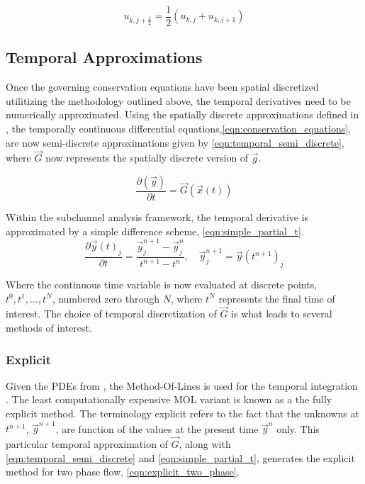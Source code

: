 \begin{equation}
\label{eqn:average_advecting_vel}
u_{k,j+\frac{1}{2}} = \frac{1}{2}\left(u_{k,j} + u_{k, j+1}\right)
\end{equation}

\subsection{Temporal Approximations}
\label{subsect:temporal_approx}
Once the governing conservation equations have been spatial discretized utilitizing the methodology outlined above, the temporal derivatives need to be numerically approximated.
Using the spatially discrete approximations defined in , the temporally continuous differential equations,\eqref{eqn:conservation_equations}, are now semi-discrete approximations given by \eqref{eqn:temporal_semi_discrete}, where $\vec{G}$ now represents the spatially discrete version of $\vec{g}$.

\begin{equation}
\label{eqn:temporal_semi_discrete}
\frac{\partial \left( \vec{y} \right)}{\partial t} = \vec{G}(\vec{x}(t))
\end{equation}

Within the subchannel analysis framework, the temporal derivative is approximated by a simple difference scheme, \eqref{eqn:simple_partial_t}.
\begin{equation}
\label{eqn:simple_partial_t}
\frac{\partial \vec{y}(t)_j}{\partial t} = \frac{ \vec{y}^{n+1}_{j} - \vec{y}^{n}_{j}}{t^{n+1}-t^{n}}, \quad \vec{y}^{n+1}_j = \vec{y}(t^{n+1})_j
\end{equation}

Where the continuous time variable is now evaluated at discrete points, $t^0, t^1, \ldots, t^N$, numbered zero through $N$, where $t^N$ represents the final time of interest.
The choice of temporal discretization of $\vec{G}$ is what leads to several methods of interest.

\subsubsection{Explicit}
\label{subsubsect:numerics_explicit}
Given the PDEs from , the Method-Of-Lines is used for the temporal integration \cite{LeVeque2007}.
The least computationally expensive MOL variant is known as a the fully explicit method.
The terminology explicit refers to the fact that the unknowns at $t^{n+1}$, $\vec{y}^{n+1}$, are function of the values at the present time $\vec{y}^{n}$ only.
This particular temporal approximation of $\vec{G}$, along with \eqref{eqn:temporal_semi_discrete} and \eqref{eqn:simple_partial_t}, generates the explicit method for two phase flow, \eqref{eqn:explicit_two_phase}.


